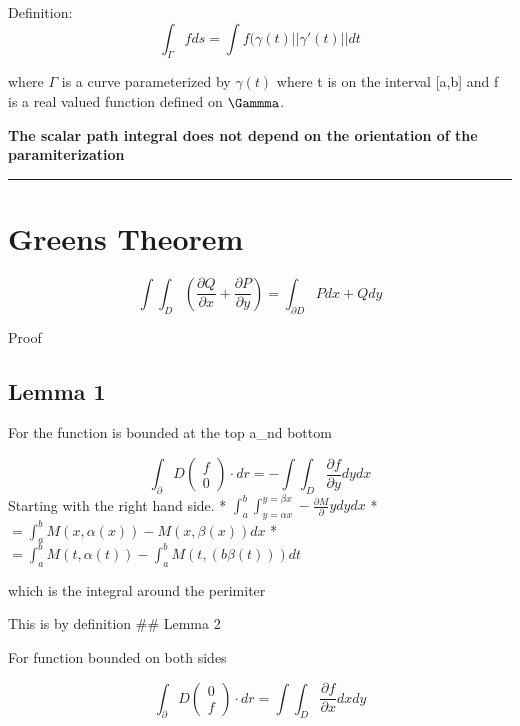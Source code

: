 \documentclass[]{article}
\begin{document}
Definition:
\[\int_{\Gamma} f ds = \int f(\gamma(t) || \gamma '(t) || dt\]

where \(\Gamma\) is a curve parameterized by \(\gamma(t)\) where t is on
the interval {[}a,b{]} and f is a real valued function defined on
\(\Gammma\).

\textbf{The scalar path integral does not depend on the orientation of
the paramiterization}

\begin{center}\rule{0.5\linewidth}{\linethickness}\end{center}

\hypertarget{greens-theorem}{%
\section{Greens Theorem}\label{greens-theorem}}

\[\int\int_D \left(\frac{\partial{Q}}{\partial{x}} + \frac{\partial{P}}{\partial{y}}\right) = \int_{\partial{D}} P dx + Q dy\]

Proof

\hypertarget{lemma-1}{%
\subsection{Lemma 1}\label{lemma-1}}

For the function is bounded at the top a\_nd bottom

\[\int_\partial{D} \begin{pmatrix} f \\ 0 \end{pmatrix} \cdot dr =- \int \int_D \frac{\partial{f}}{\partial{y}}dydx\]
Starting with the right hand side. *
\(\int_a^b \int_{y=\alpha{x}}^{y=\beta{x}} -\frac{\partial{M}}\partial{y}dydx\)
* \(=\int_a^b M(x,\alpha(x)) - M(x,\beta(x))dx\) *
\(=\int_a^b M(t, \alpha(t)) - \int_a ^b M(t,(b\beta(t)))dt\)

which is the integral around the perimiter

This is by definition \#\# Lemma 2

For function bounded on both sides

\[\int_\partial{D} \begin{pmatrix} 0 \\ f \end{pmatrix} \cdot dr = \int \int_D \frac{\partial{f}}{\partial{x}}dxdy\]
\end{document}
